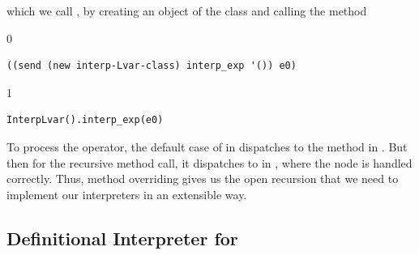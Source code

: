 \documentclass[7x10]{TimesAPriori_MIT}%
\def\racketEd{0}
\def\pythonEd{1}
\def\edition{1}
\newcommand{\pythonColor}[0]{}
\numberwithin{theorem}{chapter}
\numberwithin{definition}{chapter}
\numberwithin{equation}{chapter}
\begin{document}
%
which we call , by creating an object of the \LangVar{} class
and calling the  method
{\if\edition\racketEd
\begin{lstlisting}
((send (new interp-Lvar-class) interp_exp '()) e0)
\end{lstlisting}
\fi}
{\if\edition\pythonEd\pythonColor
\begin{lstlisting}
InterpLvar().interp_exp(e0)
\end{lstlisting}
\fi}
\noindent To process the \code{-} operator, the default case of
 in \LangVar{} dispatches to the 
method in \LangInt{}. But then for the recursive method call, it
dispatches to  in \LangVar{}, where the
 node is handled correctly. Thus, method overriding gives us
the open recursion that we need to implement our interpreters in an
extensible way.


\subsection{Definitional Interpreter for \LangVar{}}
\label{sec:interp-Lvar}
\end{document}
